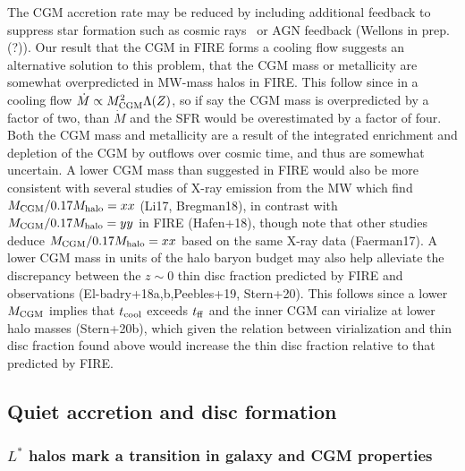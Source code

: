 \documentclass[fleqn,usenatbib]{mnras}
\newcommand{\Mdot}{\dot{M}}
\begin{document}
The CGM accretion rate may be reduced by including additional feedback to suppress star formation such as cosmic rays~\citep{Chan2019, Hopkins2020, Hopkins2020a, Hopkins2020b}
or AGN feedback (Wellons in prep.(?)). 
Our result that the CGM in FIRE forms a cooling flow suggests an alternative solution to this problem, that the CGM mass or metallicity are somewhat overpredicted in MW-mass halos in FIRE.
This follow since in a cooling flow $\Mdot\propto M_{\rm CGM}^2 \Lambda(Z)$, so if say the CGM mass is overpredicted by a factor of two, than $\Mdot$ and the SFR would be overestimated by a factor of four.
Both the CGM mass and metallicity are a result of the integrated enrichment and depletion of the CGM by outflows over cosmic time, and thus are somewhat uncertain. %
A lower CGM mass than suggested in FIRE would also be more consistent with several studies of X-ray emission from the MW which find $M_{\rm CGM}/0.17M_{\rm halo}=xx$ (Li17, Bregman18), in contrast with $M_{\rm CGM}/0.17M_{\rm halo}=yy$ in FIRE (Hafen+18), though note that other studies deduce $M_{\rm CGM}/0.17M_{\rm halo}=xx$ based on the same X-ray data (Faerman17).
A lower CGM mass in units of the halo baryon budget may also help alleviate the discrepancy between the $z\sim0$ thin disc fraction predicted by FIRE and observations (El-badry+18a,b,Peebles+19, Stern+20).
This follows since a lower $M_{\rm CGM}$ implies that $t_{\rm cool}$ exceeds $t_{\rm ff}$ and the inner CGM can virialize at lower halo masses (Stern+20b), which given the relation between virialization and thin disc fraction found above would increase the thin disc fraction relative to that predicted by FIRE. 

\subsection{Quiet accretion and disc formation}
\label{s: disc formation}

\subsubsection{$L^*$ halos mark a transition in galaxy and CGM properties}
\label{s: disc formation -- transition}
\end{document}
